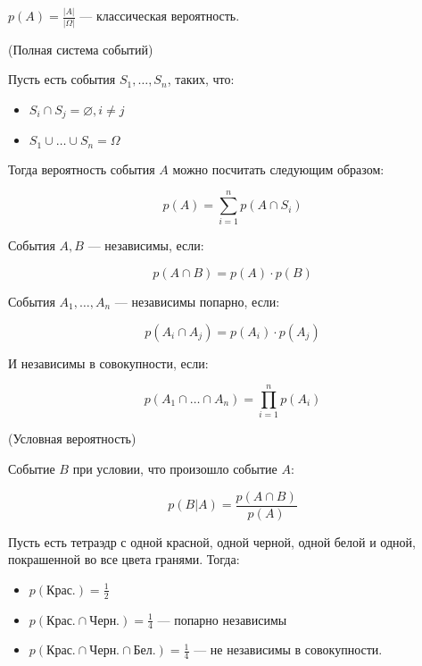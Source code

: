 \begin{definition}
    $p(A) = \frac{|A|}{|\Omega|}$ --- классическая вероятность.
\end{definition}

\begin{definition} (Полная система событий)
    
    Пусть есть события $S_1, \ldots, S_n$, таких, что:
    \begin{itemize}
        \item $S_i \cap S_j = \varnothing, i \neq j$
        \item $S_1 \cup \ldots \cup S_n = \Omega$
    \end{itemize}

    Тогда вероятность события $A$ можно посчитать следующим образом:

    $$p(A) = \sum_{i=1}^{n} p(A \cap S_i)$$
\end{definition}

\begin{definition}
    События $A, B$ --- независимы, если:

    $$p(A \cap B) = p(A) \cdot p(B)$$
\end{definition}

\begin{definition}
    События $A_1, \ldots, A_n$ --- независимы попарно, если:

    $$p(A_i \cap A_j) = p(A_i) \cdot p(A_j)$$

    И независимы в совокупности, если:

    $$p(A_1 \cap \ldots \cap A_n) = \prod_{i=1}^{n}p(A_i)$$
\end{definition}

\begin{definition} (Условная вероятность)
    
    Событие $B$ при условии, что произошло событие $A$:

    $$p(B | A) = \frac{p(A \cap B)}{p(A)}$$
\end{definition}


\begin{eg}
    Пусть есть тетраэдр с одной красной, одной черной, одной белой и одной, покрашенной во все цвета гранями. Тогда:

    \begin{itemize}
        \item $p(\text{Крас.}) = \frac{1}{2}$
        \item $p(\text{Крас.} \cap \text{Черн.}) = \frac{1}{4}$ --- попарно независимы
        \item $p(\text{Крас.} \cap \text{Черн.} \cap \text{Бел.}) = \frac{1}{4}$ --- не независимы в совокупности.
    \end{itemize}
\end{eg}

